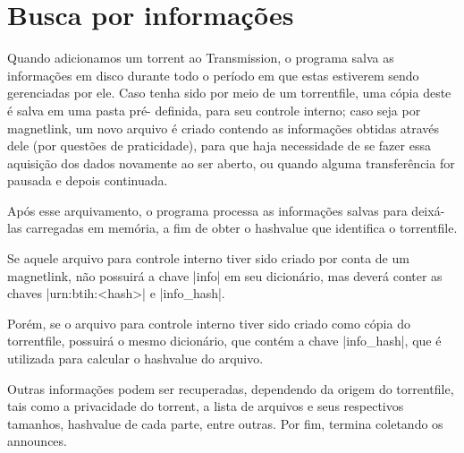 
\section{Busca por informações}

Quando adicionamos um \gls*{torrent} ao Transmission, o programa salva as informações em
disco durante todo o período em que estas estiverem sendo gerenciadas por ele. Caso
tenha sido por meio de um \gls*{torrentfile}, uma cópia deste é salva em uma pasta pré-
definida, para seu controle interno; caso seja por \gls*{magnetlink}, um novo arquivo é
criado contendo as informações obtidas através dele (por questões de praticidade), para
que haja necessidade de se fazer essa aquisição dos dados novamente ao ser aberto, ou
quando alguma transferência for pausada e depois continuada.

Após esse arquivamento, o programa processa as informações salvas para deixá-las
carregadas em memória, a fim de obter o \gls*{hashvalue} que identifica o
\gls*{torrentfile}.


Se aquele arquivo para controle interno tiver sido criado por conta de um
\gls*{magnetlink}, não possuirá a chave \bverb|info| em seu dicionário, mas deverá
conter as chaves \bverb|urn:btih:<hash>| e \bverb|info_hash|.


Porém, se o arquivo para controle interno tiver sido criado como cópia do
\gls*{torrentfile}, possuirá o mesmo dicionário, que contém a chave \bverb|info_hash|,
que é utilizada para calcular o \gls*{hashvalue} do arquivo.


Outras informações podem ser recuperadas, dependendo da origem do \gls*{torrentfile},
tais como a privacidade do \gls*{torrent}, a lista de arquivos e seus respectivos
tamanhos, \gls*{hashvalue} de cada parte, entre outras. Por fim, termina coletando os
\glspl{announce}.








